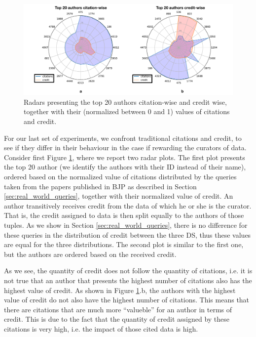 \begin{figure}[]
\centering
  \includegraphics[width=1\textwidth]{figures/2_radars}
  \caption{Radars presenting the top 20 authors citation-wise and credit wise, together with their (normalized between 0 and 1) values of citations and credit.}
  \label{figure:2_radars}
\end{figure}

For our last set of experiments, we confront traditional citations and credit, to see if they differ in their behaviour in the case if rewarding the curators of data.
Consider first Figure \ref{figure:2_radars}, where we report two radar plots.
The first plot presents the top 20 author (we identify the authors with their ID instead of their name), ordered based on the normalized value of citations distributed by the queries taken from the papers published in BJP as described in Section \ref{sec:real_world_queries}, together with their normalized value of credit. 
An author transitively receives credit from the data of which he or she is the curator. That is, the credit assigned to data is then split equally to the authors of those tuples. 
As we show in Section \ref{sec:real_world_queries}, there is no difference for these queries in the distribution of credit between the three DS, thus these values are equal for the three distributions.  
The second plot is similar to the first one, but the authors are ordered based on the received credit. 

As we see, the quantity of credit does not follow the quantity of citations, i.e. it is not true that an author that presents the highest number of citations also has the highest value of credit. 
As shown in Figure \ref{figure:2_radars}.b, the authors with the highest value of credit do not also have the highest number of citations. 
This means that there are citations that are much more ``valueble'' for an author in terms of credit. This is due to the fact that the quantity of credit assigned by these citations is very high, i.e. the impact of those cited data is high. 

